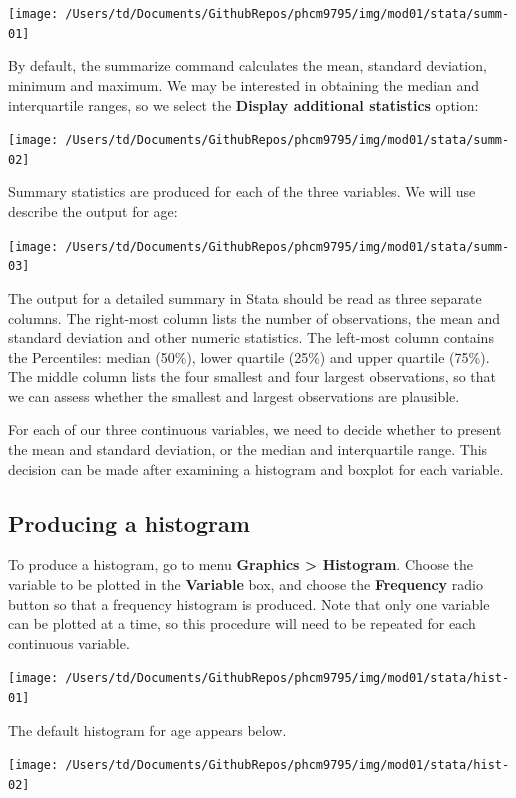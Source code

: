\documentclass[
]{memoir}
\begin{document}
\texttt{[image: /Users/td/Documents/GithubRepos/phcm9795/img/mod01/stata/summ-01]}

By default, the summarize command calculates the mean, standard deviation, minimum and maximum. We may be interested in obtaining the median and interquartile ranges, so we select the \textbf{Display additional statistics} option:

\texttt{[image: /Users/td/Documents/GithubRepos/phcm9795/img/mod01/stata/summ-02]}

Summary statistics are produced for each of the three variables. We will use describe the output for age:

\texttt{[image: /Users/td/Documents/GithubRepos/phcm9795/img/mod01/stata/summ-03]}

The output for a detailed summary in Stata should be read as three separate columns. The right-most column lists the number of observations, the mean and standard deviation and other numeric statistics. The left-most column contains the Percentiles: median (50\%), lower quartile (25\%) and upper quartile (75\%). The middle column lists the four smallest and four largest observations, so that we can assess whether the smallest and largest observations are plausible.

For each of our three continuous variables, we need to decide whether to present the mean and standard deviation, or the median and interquartile range. This decision can be made after examining a histogram and boxplot for each variable.

\hypertarget{producing-a-histogram}{%
\subsection{Producing a histogram}\label{producing-a-histogram}}

To produce a histogram, go to menu \textbf{Graphics \textgreater{} Histogram}. Choose the variable to be plotted in the \textbf{Variable} box, and choose the \textbf{Frequency} radio button so that a frequency histogram is produced. Note that only one variable can be plotted at a time, so this procedure will need to be repeated for each continuous variable.

\texttt{[image: /Users/td/Documents/GithubRepos/phcm9795/img/mod01/stata/hist-01]}

The default histogram for age appears below.

\texttt{[image: /Users/td/Documents/GithubRepos/phcm9795/img/mod01/stata/hist-02]}
\end{document}
